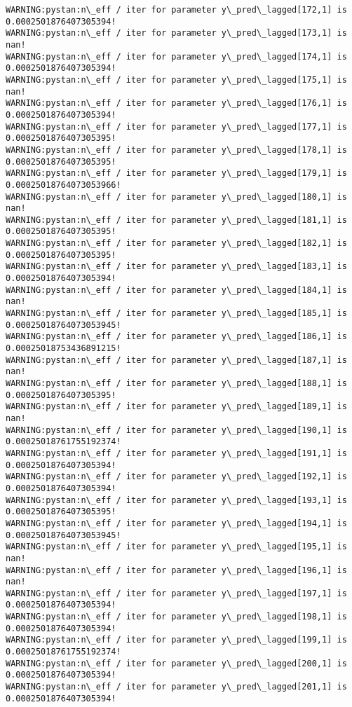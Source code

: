 \documentclass[11pt]{article}
\begin{document}
\begin{Verbatim}[commandchars=\\\{\}]
WARNING:pystan:n\_eff / iter for parameter y\_pred\_lagged[172,1] is 0.0002501876407305394!
WARNING:pystan:n\_eff / iter for parameter y\_pred\_lagged[173,1] is nan!
WARNING:pystan:n\_eff / iter for parameter y\_pred\_lagged[174,1] is 0.0002501876407305394!
WARNING:pystan:n\_eff / iter for parameter y\_pred\_lagged[175,1] is nan!
WARNING:pystan:n\_eff / iter for parameter y\_pred\_lagged[176,1] is 0.0002501876407305394!
WARNING:pystan:n\_eff / iter for parameter y\_pred\_lagged[177,1] is 0.0002501876407305395!
WARNING:pystan:n\_eff / iter for parameter y\_pred\_lagged[178,1] is 0.0002501876407305395!
WARNING:pystan:n\_eff / iter for parameter y\_pred\_lagged[179,1] is 0.00025018764073053966!
WARNING:pystan:n\_eff / iter for parameter y\_pred\_lagged[180,1] is nan!
WARNING:pystan:n\_eff / iter for parameter y\_pred\_lagged[181,1] is 0.0002501876407305395!
WARNING:pystan:n\_eff / iter for parameter y\_pred\_lagged[182,1] is 0.0002501876407305395!
WARNING:pystan:n\_eff / iter for parameter y\_pred\_lagged[183,1] is 0.0002501876407305394!
WARNING:pystan:n\_eff / iter for parameter y\_pred\_lagged[184,1] is nan!
WARNING:pystan:n\_eff / iter for parameter y\_pred\_lagged[185,1] is 0.00025018764073053945!
WARNING:pystan:n\_eff / iter for parameter y\_pred\_lagged[186,1] is 0.00025018753436891215!
WARNING:pystan:n\_eff / iter for parameter y\_pred\_lagged[187,1] is nan!
WARNING:pystan:n\_eff / iter for parameter y\_pred\_lagged[188,1] is 0.0002501876407305395!
WARNING:pystan:n\_eff / iter for parameter y\_pred\_lagged[189,1] is nan!
WARNING:pystan:n\_eff / iter for parameter y\_pred\_lagged[190,1] is 0.00025018761755192374!
WARNING:pystan:n\_eff / iter for parameter y\_pred\_lagged[191,1] is 0.0002501876407305394!
WARNING:pystan:n\_eff / iter for parameter y\_pred\_lagged[192,1] is 0.0002501876407305394!
WARNING:pystan:n\_eff / iter for parameter y\_pred\_lagged[193,1] is 0.0002501876407305395!
WARNING:pystan:n\_eff / iter for parameter y\_pred\_lagged[194,1] is 0.00025018764073053945!
WARNING:pystan:n\_eff / iter for parameter y\_pred\_lagged[195,1] is nan!
WARNING:pystan:n\_eff / iter for parameter y\_pred\_lagged[196,1] is nan!
WARNING:pystan:n\_eff / iter for parameter y\_pred\_lagged[197,1] is 0.0002501876407305394!
WARNING:pystan:n\_eff / iter for parameter y\_pred\_lagged[198,1] is 0.0002501876407305394!
WARNING:pystan:n\_eff / iter for parameter y\_pred\_lagged[199,1] is 0.00025018761755192374!
WARNING:pystan:n\_eff / iter for parameter y\_pred\_lagged[200,1] is 0.0002501876407305394!
WARNING:pystan:n\_eff / iter for parameter y\_pred\_lagged[201,1] is 0.0002501876407305394!

\end{Verbatim}
\end{document}
